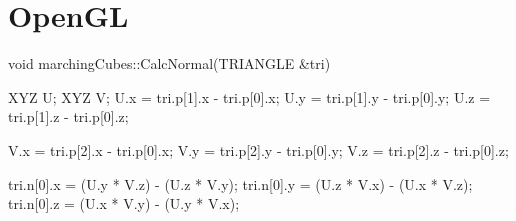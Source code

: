 \section{OpenGL}

\begin{CCode}
	void marchingCubes::CalcNormal(TRIANGLE &tri){
		XYZ U;
		XYZ V;
		U.x = tri.p[1].x - tri.p[0].x;
		U.y = tri.p[1].y - tri.p[0].y;
		U.z = tri.p[1].z - tri.p[0].z;
		
		V.x = tri.p[2].x - tri.p[0].x;
		V.y = tri.p[2].y - tri.p[0].y;
		V.z = tri.p[2].z - tri.p[0].z;
		
		tri.n[0].x = (U.y * V.z) - (U.z * V.y);
		tri.n[0].y = (U.z * V.x) - (U.x * V.z);
		tri.n[0].z = (U.x * V.y) - (U.y * V.x);
	}
\end{CCode}